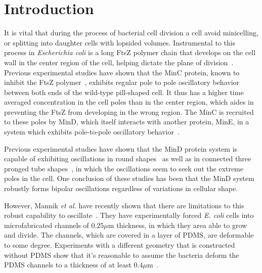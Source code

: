 \documentclass[letterpaper,twocolumn,amsmath,amssymb,pre]{revtex4-1}
\newcommand\micron{\ensuremath{\mu\text{m}}}
\begin{document}
\maketitle

\section{Introduction}

It is vital that during the process of bacterial cell
division a cell avoid minicelling, or splitting into daughter cells
with lopsided volumes.  Instrumental to this process in
\emph{Escherichia coli} is a long FtsZ polymer chain that develops on
the cell wall in the center region of the cell, helping dictate the
plane of division~\cite{adams2009bacterial,
  lutkenhaus2007assembly}. Previous experimental studies have shown
that the MinC protein, known to inhibit the FtsZ
polymer~\cite{shen2010examination}, exhibits regular pole to pole
oscillatory behavior between both ends of the wild-type pill-shaped
cell.  It thus has a higher time averaged concentration in the cell
poles than in the center region, which aides in preventing the FtsZ
from developing in the wrong region.  The MinC is recruited to these
poles by MinD, which itself interacts with another protein, MinE, in a
system which exhibits pole-to-pole oscillatory
behavior~\cite{shapiro2009and, yu1999ftsz,
  meacci2005min,huang2003dynamic,kerr2006division,mannik2009bacterial}.

Previous experimental studies have shown that the MinD protein system
is capable of exhibiting oscillations in round
shapes~\cite{fange2006noise} as well as in connected three pronged
tube shapes~\cite{varma2008min}, in which the oscillations seem to
seek out the extreme poles in the cell.  One conclusion of these
studies has been that the MinD system robustly forms bipolar
oscillations regardless of variations in cellular shape.

However, Mannik \emph{et al.} have recently shown that there are
limitations to this robust capability to
oscillate~\cite{mannik2012robustness,mannik2009bacterial,mannik2010bacteria}. They
have experimentally forced \emph{E. coli} cells into microfabricated
channels of $0.25\micron$ thickness, in which they area able to grow
and divide. The channels, which are covered in a layer of PDMS, are
deformable to some degree.  Experiments with a different geometry that
is constructed without PDMS show that it's reasonable to assume the
bacteria deform the PDMS channels to a thickness of at least
$0.4\micron$~\cite{mannik2009bacterial,mannik2010bacteria}.
\end{document}
